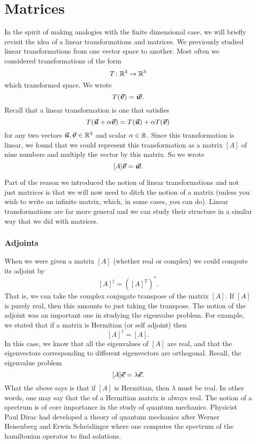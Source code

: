 \section{Matrices}
In the spirit of making analogies with the finite dimensional case, we will briefly revisit the idea of a linear transformations and matrices.  We previously studied linear transformations from one vector space to another. Most often we considered transformations of the form
\[
T \colon \mathbb{R}^3 \to \mathbb{R}^3
\]
which transformed space. We wrote
\[
T(\boldsymbol{\boldsymbol{\vec{v}}})=\boldsymbol{\boldsymbol{\vec{w}}}.
\]
Recall that a linear transformation is one that satisfies
\[
T(\boldsymbol{\boldsymbol{\vec{u}}}+\alpha \boldsymbol{\boldsymbol{\vec{v}}}) = T(\boldsymbol{\boldsymbol{\vec{u}}})+\alpha T(\boldsymbol{\boldsymbol{\vec{v}}})
\]
for any two vectors $\boldsymbol{\boldsymbol{\vec{u}}},\boldsymbol{\boldsymbol{\vec{v}}} \in \mathbb{R}^3$ and scalar $\alpha \in \mathbb{R}$. Since this transformation is linear, we found that we could represent this transformation as a matrix $[A]$ of nine numbers and multiply the vector by this matrix. So we wrote
\[
[A]\boldsymbol{\boldsymbol{\vec{v}}} = \boldsymbol{\boldsymbol{\vec{w}}}.
\]

Part of the reason we introduced the notion of linear transformations and not just matrices is that we will now need to ditch the notion of a matrix (unless you wish to write an infinite matrix, which, in some cases, you can do). Linear transformations are far more general and we can study their structure in a similar way that we did with matrices. 

\subsubsection{Adjoints}

When we were given a matrix $[A]$ (whether real or complex) we could compute its adjoint by 
\[
[A]^\dagger=\left([A]^T\right)^*.
\]
That is, we can take the complex conjugate transpose of the matrix $[A]$. If $[A]$ is purely real, then this amounts to just taking the transpose. The notion of the adjoint was an important one in studying the eigenvalue problem.  For example, we stated that if a matrix is Hermitian (or self adjoint) then
\[
[A]^\dagger = [A].
\]
In this case, we know that all the eigenvalues of $[A]$ are real, and that the eigenvectors corresponding to different eigenvectors are orthogonal.  Recall, the eigenvalue problem
\[
[A]\boldsymbol{\vec{e}} = \lambda \boldsymbol{\vec{e}}.
\]
What the above says is that if $[A]$ is Hermitian, then $\lambda$ must be real.  In other words, one may say that the  of a Hermitian matrix is always real.  The notion of a spectrum is of core importance in the study of quantum mechanics. Physicist Paul Dirac had developed a theory of quantum mechanics after Werner Heisenberg and Erwin Schr\"odinger where one computes the spectrum of the hamiltonian operator to find solutions.

